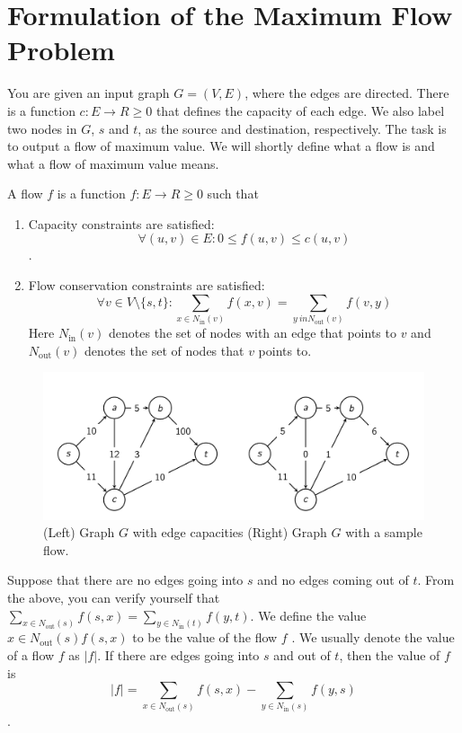 \documentclass [12pt]{article}
\theoremstyle{definition}
\begin{document}
\section{Formulation of the Maximum Flow Problem}

You are given an input graph $G = (V, E)$, where the edges are directed. There is a function $c : E \to R\geq 0$ that defines the capacity of each edge. We also label two nodes in $G$, $s$ and $t$, as the source and destination, respectively. The task is to output a flow of maximum value. We will shortly define what a flow is and what a flow of maximum value means. 

A flow $f$ is a function $f : E \to R\geq 0$ such that 
\begin{enumerate}
    \item Capacity constraints are satisfied: 
    $$
        \forall (u, v ) \in E : 0 \leq f (u, v ) \leq c(u, v )
    $$. 
    \item Flow conservation constraints are satisfied: 
    $$
    \forall v \in V \setminus \{s, t\} : \sum_{x \in N_{\text{in}}(v)} f (x, v ) = \sum_{y\ in N_{\text{out}}(v)} f (v, y )
    $$
    Here $N_{\text{in}}(v )$ denotes the set of nodes with an edge that points to $v$ and $N_{\text{out}}(v )$ denotes the set of nodes that $v$ points to.
\end{enumerate}

\begin{figure}[h!]
    \centering
    \includegraphics[scale=0.6]{max_flow_ex.png}
    \caption{(Left) Graph $G$ with edge capacities (Right) Graph $G$ with a sample flow.}
    \label{fig:max_flow_ex}
\end{figure}
 

Suppose that there are no edges going into $s$ and no edges coming out of $t$. From the above, you can verify yourself that $\sum_{x \in N_{\text{out}}(s)} f (s, x) = \sum_{y \in N_{\text{in}}(t)} f (y, t)$. We define the value $x \in N_{\text{out}}(s) f (s, x)$ to be the value of the flow $f$ . We usually denote the value of a flow $f$ as $|f |$. If there are edges going into $s$ and out of $t$, then the value of $f$ is $$
|f | = \sum_{x \in N_{\text{out}}(s)} f (s, x) - \sum_{ y \in N_{\text{in}}(s)} f (y, s)
$$.
\end{document}
